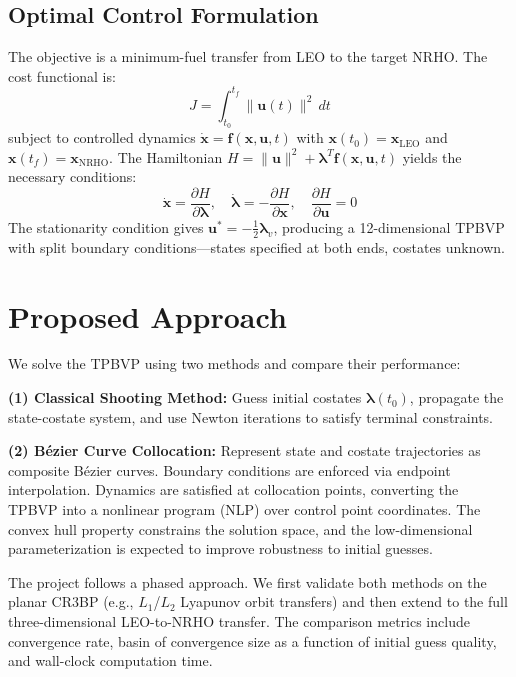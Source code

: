 \documentclass[11pt]{article}
\begin{document}
\subsection{Optimal Control Formulation}

The objective is a minimum-fuel transfer from LEO to the target NRHO. The cost functional is:
\begin{equation}
J = \int_{t_0}^{t_f} \|\mathbf{u}(t)\|^2 \, dt
\end{equation}
subject to controlled dynamics $\dot{\mathbf{x}} = \mathbf{f}(\mathbf{x}, \mathbf{u}, t)$ with $\mathbf{x}(t_0) = \mathbf{x}_{\text{LEO}}$ and $\mathbf{x}(t_f) = \mathbf{x}_{\text{NRHO}}$.
The Hamiltonian $H = \|\mathbf{u}\|^2 + \boldsymbol{\lambda}^T \mathbf{f}(\mathbf{x}, \mathbf{u}, t)$ yields the necessary conditions:
\begin{equation}
\dot{\mathbf{x}} = \frac{\partial H}{\partial \boldsymbol{\lambda}}, \quad
\dot{\boldsymbol{\lambda}} = -\frac{\partial H}{\partial \mathbf{x}}, \quad
\frac{\partial H}{\partial \mathbf{u}} = 0
\end{equation}
The stationarity condition gives $\mathbf{u}^* = -\frac{1}{2}\boldsymbol{\lambda}_v$, producing a 12-dimensional TPBVP with split boundary conditions---states specified at both ends, costates unknown.

\section{Proposed Approach}

We solve the TPBVP using two methods and compare their performance:

\textbf{(1) Classical Shooting Method:} Guess initial costates $\boldsymbol{\lambda}(t_0)$, propagate the state-costate system, and use Newton iterations to satisfy terminal constraints.

\textbf{(2) B\'{e}zier Curve Collocation:} Represent state and costate trajectories as composite B\'{e}zier curves. Boundary conditions are enforced via endpoint interpolation. Dynamics are satisfied at collocation points, converting the TPBVP into a nonlinear program (NLP) over control point coordinates. The convex hull property constrains the solution space, and the low-dimensional parameterization is expected to improve robustness to initial guesses.

The project follows a phased approach. We first validate both methods on the planar CR3BP (e.g., $L_1$/$L_2$ Lyapunov orbit transfers) and then extend to the full three-dimensional LEO-to-NRHO transfer. The comparison metrics include convergence rate, basin of convergence size as a function of initial guess quality, and wall-clock computation time.
\end{document}
